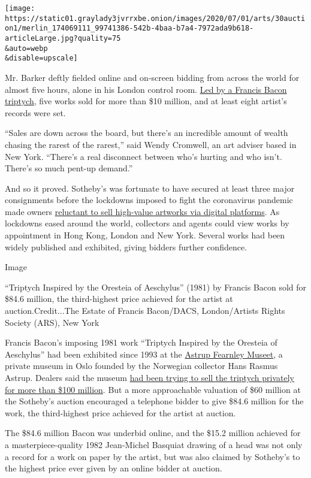 \texttt{[image: https://static01.graylady3jvrrxbe.onion/images/2020/07/01/arts/30auction1/merlin\_174069111\_99741386-542b-4baa-b7a4-7972ada9b618-articleLarge.jpg?quality=75\\\&auto=webp\\\&disable=upscale]}

Mr. Barker deftly fielded online and on-screen bidding from across the
world for almost five hours, alone in his London control room.
\href{https://www.nytimes3xbfgragh.onion/2020/06/29/arts/design/sothebys-online-auction-francis-bacon.html}{Led
by a Francis Bacon triptych}, five works sold for more than \$10
million, and at least eight artist's records were set.

``Sales are down across the board, but there's an incredible amount of
wealth chasing the rarest of the rarest,'' said Wendy Cromwell, an art
adviser based in New York. ``There's a real disconnect between who's
hurting and who isn't. There's so much pent-up demand.''

And so it proved. Sotheby's was fortunate to have secured at least three
major consignments before the lockdowns imposed to fight the coronavirus
pandemic made owners
\href{https://www.nytimes3xbfgragh.onion/2020/06/08/arts/design/buying-art-online.html}{reluctant
to sell high-value artworks via digital platforms}. As lockdowns eased
around the world, collectors and agents could view works by appointment
in Hong Kong, London and New York. Several works had been widely
published and exhibited, giving bidders further confidence.

Image

``Triptych Inspired by the Oresteia of Aeschylus'' (1981) by Francis
Bacon sold for \$84.6 million, the third-highest price achieved for the
artist at auction.Credit...The Estate of Francis Bacon/DACS,
London/Artists Rights Society (ARS), New York

Francis Bacon's imposing 1981 work ``Triptych Inspired by the Oresteia
of Aeschylus'' had been exhibited since 1993 at the
\href{https://www.afmuseet.no/}{Astrup Fearnley Museet}, a private
museum in Oslo founded by the Norwegian collector Hans Rasmus Astrup.
Dealers said the museum
\href{https://www.nytimes3xbfgragh.onion/2020/06/29/arts/design/sothebys-online-auction-francis-bacon.html}{had
been trying to sell the triptych privately for more than \$100 million}.
But a more approachable valuation of \$60 million at the Sotheby's
auction encouraged a telephone bidder to give \$84.6 million for the
work, the third-highest price achieved for the artist at auction.

The \$84.6 million Bacon was underbid online, and the \$15.2 million
achieved for a masterpiece-quality 1982 Jean-Michel Basquiat drawing of
a head was not only a record for a work on paper by the artist, but was
also claimed by Sotheby's to the highest price ever given by an online
bidder at auction.

